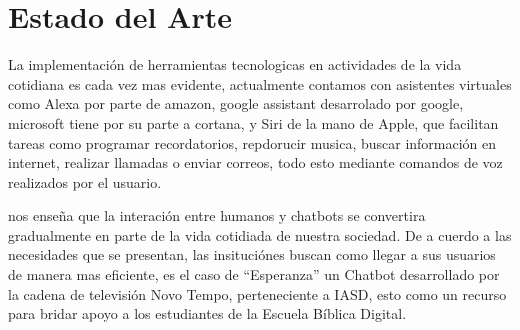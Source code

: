 \chapter{Estado del Arte}

La implementación de herramientas tecnologicas en actividades de la vida cotidiana es cada vez mas evidente, actualmente contamos con asistentes virtuales como Alexa por parte de amazon, google assistant desarrolado por google, microsoft tiene por su parte a cortana, y Siri de la mano de Apple, que facilitan tareas como programar recordatorios, repdorucir musica, buscar información en internet, realizar llamadas o enviar correos, todo esto mediante comandos de voz realizados por el usuario.

\citet{z} nos enseña que la interación entre humanos y chatbots se convertira gradualmente en parte de la vida cotidiada de nuestra sociedad. De a cuerdo a las necesidades que se presentan, las insituciónes buscan como llegar a sus usuarios de manera mas eficiente, es el caso de “Esperanza” un Chatbot desarrollado por la cadena de televisión Novo Tempo, perteneciente a
IASD, esto como un recurso para bridar apoyo a los estudiantes de la Escuela Bíblica Digital\citep{476172132004}.
